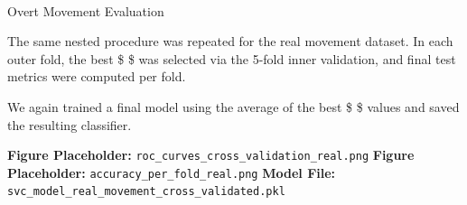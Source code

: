 \documentclass[
  letterpaper,
  DIV=11,
  numbers=noendperiod]{scrartcl}
\makeatletter
\let\oldparagraph\paragraph
\renewcommand{\paragraph}{
    \@ifstar
      \xxxParagraphStar
      \xxxParagraphNoStar
  }
\newcommand{\xxxParagraphStar}[1]{\oldparagraph*{#1}\mbox{}}
\newcommand{\xxxParagraphNoStar}[1]{\oldparagraph{#1}\mbox{}}
\makeatother
\begin{document}
\paragraph{Overt Movement Evaluation}\label{overt-movement-evaluation}

The same nested procedure was repeated for the real movement dataset. In
each outer fold, the best \$ \alpha \$ was selected via the 5-fold inner
validation, and final test metrics were computed per fold.

We again trained a final model using the average of the best \$
\alpha \$ values and saved the resulting classifier.

\textbf{Figure Placeholder:}
\texttt{roc\_curves\_cross\_validation\_real.png} \textbf{Figure
Placeholder:} \texttt{accuracy\_per\_fold\_real.png} \textbf{Model
File:} \texttt{svc\_model\_real\_movement\_cross\_validated.pkl}
\end{document}
